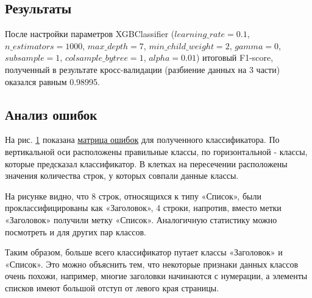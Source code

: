 \documentclass{ProcISPRAS}
\begin{document}
\subsection{Результаты}

После настройки параметров XGBClassifier \cite{tuning} ($learning\_rate=0.1$, $n\_estimators=1000$, $max\_depth=7$, $min\_child\_weight=2$,
$gamma=0$, $subsample=1$, $colsample\_bytree=1$, $alpha=0.01$) итоговый F1-score, полученный в результате кросс-валидации (разбиение данных на 3 части) оказался равным 0.98995. 

\subsection{Анализ ошибок}

На рис. \ref{fig:confusion_matrix} показана \href{https://en.wikipedia.org/wiki/Confusion_matrix}{матрица ошибок} для полученного классификатора. По вертикальной оси расположены правильные классы, по горизонтальной - классы, которые предсказал классификатор. В клетках на пересечении расположены значения количества строк, у которых совпали данные классы.

\begin{figure}[ht]
    \label{fig:confusion_matrix}
\end{figure}

На рисунке видно, что 8 строк, относящихся к типу «Список», были проклассифицированы как «Заголовок», 4 строки, напротив, вместо метки «Заголовок» получили метку «Список». Аналогичную статистику можно посмотреть и для других пар классов.

Таким образом, больше всего классификатор путает классы «Заголовок» и «Список». Это можно объяснить тем, что некоторые признаки данных классов очень похожи, например, многие заголовки начинаются с нумерации, а элементы списков имеют большой отступ от левого края страницы.
\end{document}
